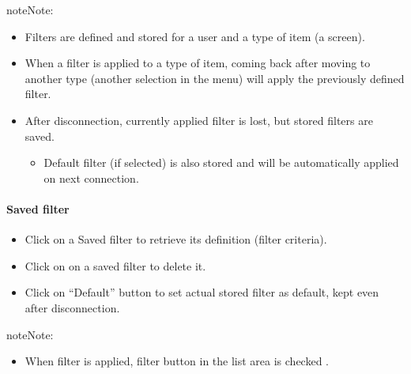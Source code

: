 \documentclass[letterpaper,10pt,english]{sphinxmanual}
\begin{document}
\begin{center}\setlength{\fboxsep}{5pt}\end{center}

\begin{notice}{note}{Note:}\begin{itemize}
\item {} 
Filters are defined and stored for a user and a type of item (a screen).

\item {} 
When a filter is applied to a type of item, coming back after moving to another type (another selection in the menu) will apply the previously defined filter.

\item {} 
After disconnection, currently applied filter is lost, but stored filters are saved.
\begin{itemize}
\item {} 
Default filter (if selected) is also stored and will be automatically applied on next connection.

\end{itemize}

\end{itemize}
\end{notice}
\paragraph{Saved filter}
\begin{itemize}
\item {} 
Click on a Saved filter to retrieve its definition (filter criteria).

\item {} 
Click on  on a saved filter to delete it.

\item {} 
Click on “Default” button to set actual stored filter as default, kept even after disconnection.

\end{itemize}

\begin{notice}{note}{Note:}\begin{itemize}
\item {} 
When filter is applied, filter button in the list area is checked .

\end{itemize}
\end{notice}
\newpage
\end{document}
